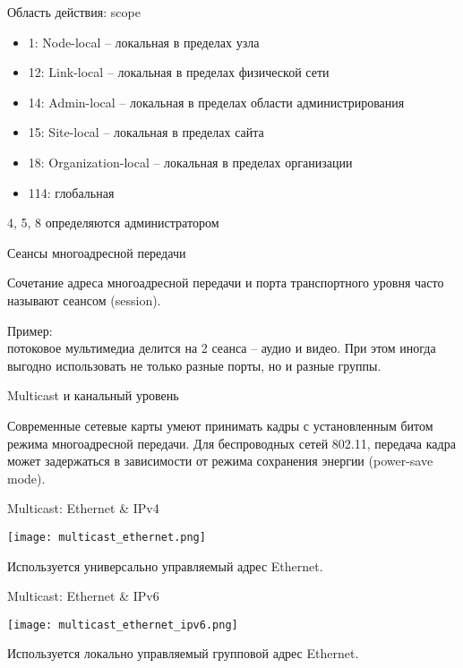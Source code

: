 \begin{frame}{Область действия: scope}
	\begin{itemize}
			\item 1: Node-local – локальная в пределах узла
			\item 12: Link-local – локальная в пределах физической сети
			\item 14: Admin-local – локальная в пределах области администрирования
			\item 15: Site-local – локальная в пределах сайта
			\item 18: Organization-local – локальная в пределах организации
			\item 114: глобальная
	\end{itemize}
	
	4, 5, 8 определяются администратором

\end{frame}


\begin{frame}{Сеансы многоадресной передачи}

	Сочетание адреса многоадресной передачи и порта транспортного уровня часто называют сеансом (session).
	\bigskip

	 Пример:\\
	 потоковое мультимедиа делится на 2 сеанса -- аудио и видео. 
	 При этом иногда выгодно использовать не только разные порты,  но и разные группы.
\end{frame}


\begin{frame}{Multicast и канальный уровень}

	Современные сетевые карты умеют принимать кадры с установленным битом режима многоадресной передачи.
	\bigskip
	Для беспроводных сетей 802.11,  передача кадра может задержаться в зависимости от
	режима сохранения энергии (power-save mode).

\end{frame}



\begin{frame}{Multicast: Ethernet \& IPv4}
	
	\center\texttt{[image: multicast\_ethernet.png]}

	Используется универсально управляемый адрес Ethernet.

\end{frame}


\begin{frame}{Multicast: Ethernet \& IPv6}

	\center\texttt{[image: multicast\_ethernet\_ipv6.png]}

	Используется локально управляемый групповой адрес Ethernet.
\end{frame}


